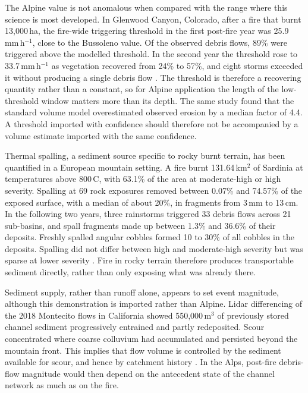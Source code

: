\documentclass[11pt,a4paper]{article}
\begin{document}
The Alpine value is not anomalous when compared with the range where this science is most developed. In Glenwood Canyon, Colorado, after a fire that burnt 13{,}000\,ha, the fire-wide triggering threshold in the first post-fire year was 25.9\,mm\,h$^{-1}$, close to the Bussoleno value. Of the observed debris flows, 89\% were triggered above the modelled threshold. In the second year the threshold rose to 33.7\,mm\,h$^{-1}$ as vegetation recovered from 24\% to 57\%, and eight storms exceeded it without producing a single debris flow \citep{rengers_evaluating_2024}. The threshold is therefore a recovering quantity rather than a constant, so for Alpine application the length of the low-threshold window matters more than its depth. The same study found that the standard volume model overestimated observed erosion by a median factor of 4.4. A threshold imported with confidence should therefore not be accompanied by a volume estimate imported with the same confidence.

Thermal spalling, a sediment source specific to rocky burnt terrain, has been quantified in a European mountain setting. A fire burnt 131.64\,km$^2$ of Sardinia at temperatures above 800\,\degree{}C, with 63.1\% of the area at moderate-high or high severity. Spalling at 69 rock exposures removed between 0.07\% and 74.57\% of the exposed surface, with a median of about 20\%, in fragments from 3\,mm to 13\,cm. In the following two years, three rainstorms triggered 33 debris flows across 21 sub-basins, and spall fragments made up between 1.3\% and 36.6\% of their deposits. Freshly spalled angular cobbles formed 10 to 30\% of all cobbles in the deposits. Spalling did not differ between high and moderate-high severity but was sparse at lower severity \citep{pala_sediment_2025}. Fire in rocky terrain therefore produces transportable sediment directly, rather than only exposing what was already there.

Sediment supply, rather than runoff alone, appears to set event magnitude, although this demonstration is imported rather than Alpine. Lidar differencing of the 2018 Montecito flows in California showed 550{,}000\,m$^3$ of previously stored channel sediment progressively entrained and partly redeposited. Scour concentrated where coarse colluvium had accumulated and persisted beyond the mountain front. This implies that flow volume is controlled by the sediment available for scour, and hence by catchment history \citep{morell_sediment_2021}. In the Alps, post-fire debris-flow magnitude would then depend on the antecedent state of the channel network as much as on the fire.
\end{document}
